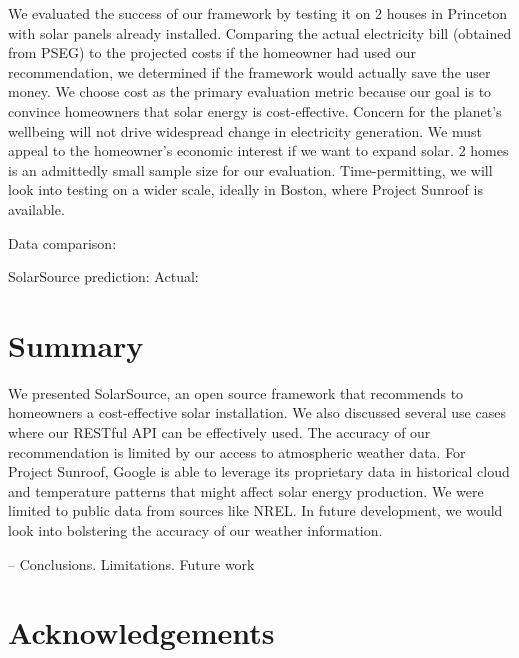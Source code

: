 \documentclass[pageno]{jpaper}
\begin{document}
We evaluated the success of our framework by testing it on 2 houses in Princeton with solar panels already installed. Comparing the actual electricity bill (obtained from PSEG) to the projected costs if the homeowner had used our recommendation, we determined if the framework would actually save the user money. We choose cost as the primary evaluation metric because our goal is to convince homeowners that solar energy is cost-effective. Concern for the planet's wellbeing will not drive widespread change in electricity generation. We must appeal to the homeowner's economic interest if we want to expand solar. 2 homes is an admittedly small sample size for our evaluation. Time-permitting, we will look into testing on a wider scale, ideally in Boston, where Project Sunroof is available.

Data comparison:

SolarSource prediction:
Actual:

\section{Summary}
We presented SolarSource, an open source framework that recommends to homeowners a cost-effective solar installation. We also discussed several use cases where our RESTful API can be effectively used. \newline
\newline
The accuracy of our recommendation is limited by our access to atmospheric weather data. For Project Sunroof, Google is able to leverage its proprietary data in historical cloud and temperature patterns that might affect solar energy production. We were limited to public data from sources like NREL. In future development, we would look into bolstering the accuracy of our weather information.

-- Conclusions.  Limitations.  Future work

\section{Acknowledgements}




\end{document}
